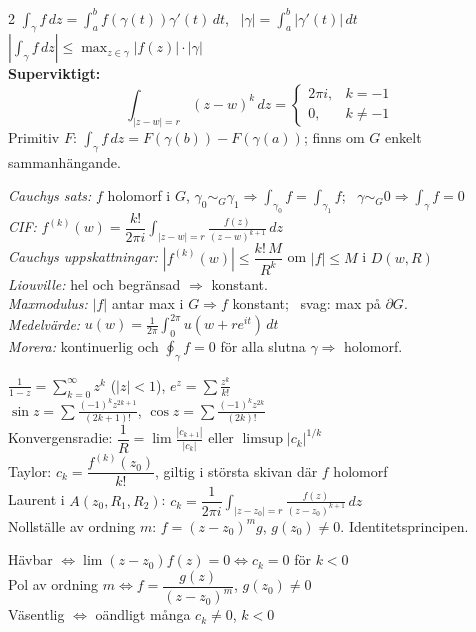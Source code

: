 \begin{multicols}{2}
$\displaystyle\int_\gamma f\,dz = \int_a^b f(\gamma(t))\gamma'(t)\,dt$, \ $|\gamma| = \int_a^b |\gamma'(t)|\,dt$ \\
$\displaystyle\left| \int_\gamma f\,dz \right| \le \max_{z \in \gamma}|f(z)| \cdot |\gamma|$ \\
\textbf{Superviktigt:}
\[ \int_{|z - w| = r} (z - w)^k\,dz = \begin{cases} 2\pi i, & k = -1 \\ 0, & k \neq -1 \end{cases} \]
Primitiv $F$: $\int_\gamma f\,dz = F(\gamma(b)) - F(\gamma(a))$; finns om $G$ enkelt sammanhängande.

\emph{Cauchys sats:} $f$ holomorf i $G$, $\gamma_0 \sim_G \gamma_1 \Rightarrow \int_{\gamma_0} f = \int_{\gamma_1} f$; \ $\gamma \sim_G 0 \Rightarrow \int_\gamma f = 0$ \\
\emph{CIF:} $f^{(k)}(w) = \dfrac{k!}{2\pi i}\displaystyle\int_{|z - w| = r} \frac{f(z)}{(z - w)^{k+1}}\,dz$ \\
\emph{Cauchys uppskattningar:} $|f^{(k)}(w)| \le \dfrac{k!\,M}{R^k}$ om $|f| \le M$ i $D(w, R)$ \\
\emph{Liouville:} hel och begränsad $\Rightarrow$ konstant. \\
\emph{Maxmodulus:} $|f|$ antar max i $G \Rightarrow f$ konstant; \ svag: max på $\partial G$. \\
\emph{Medelvärde:} $u(w) = \frac{1}{2\pi}\int_0^{2\pi} u(w + re^{it})\,dt$ \\
\emph{Morera:} kontinuerlig och $\oint_\gamma f = 0$ för alla slutna $\gamma \Rightarrow$ holomorf.

$\displaystyle\frac{1}{1 - z} = \sum_{k=0}^\infty z^k$ ($|z| < 1$), \quad $e^z = \sum \frac{z^k}{k!}$ \\
$\sin z = \sum \frac{(-1)^k z^{2k+1}}{(2k+1)!}$, \quad $\cos z = \sum \frac{(-1)^k z^{2k}}{(2k)!}$ \\
Konvergensradie: $\dfrac1R = \displaystyle\lim \frac{|c_{k+1}|}{|c_k|}$ eller $\limsup |c_k|^{1/k}$ \\
Taylor: $c_k = \dfrac{f^{(k)}(z_0)}{k!}$, giltig i största skivan där $f$ holomorf \\
Laurent i $A(z_0, R_1, R_2)$: $c_k = \dfrac{1}{2\pi i}\displaystyle\int_{|z - z_0| = r} \frac{f(z)}{(z - z_0)^{k+1}}\,dz$ \\
Nollställe av ordning $m$: $f = (z - z_0)^m g$, $g(z_0) \neq 0$. Identitetsprincipen.

Hävbar $\Leftrightarrow \lim (z - z_0)f(z) = 0 \Leftrightarrow c_k = 0$ för $k < 0$ \\
Pol av ordning $m \Leftrightarrow f = \dfrac{g(z)}{(z - z_0)^m}$, $g(z_0) \neq 0$ \\
Väsentlig $\Leftrightarrow$ oändligt många $c_k \neq 0$, $k < 0$


\end{multicols}
